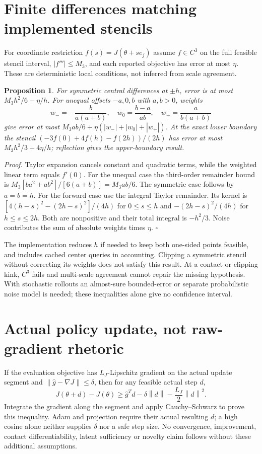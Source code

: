 \documentclass{article}
\newtheorem{proposition}{Proposition}
\newcommand{\norm}[1]{\left\|#1\right\|}
\begin{document}
\section{Finite differences matching implemented stencils}
For coordinate restriction $f(s)=J(\theta+se_j)$ assume $f\in C^3$ on the full feasible stencil interval, $|f'''|\le M_3$, and each reported objective has error at most $\eta$. These are deterministic local conditions, not inferred from scale agreement.
\begin{proposition}
For symmetric central differences at $\pm h$, error is at most $M_3h^2/6+\eta/h$. For unequal offsets $-a,0,b$ with $a,b>0$, weights
\[
w_-=-\frac{b}{a(a+b)},\quad w_0=\frac{b-a}{ab},\quad w_+=\frac{a}{b(a+b)}
\]
give error at most $M_3ab/6+\eta(|w_-|+|w_0|+|w_+|)$. At the exact lower boundary the stencil $(-3f(0)+4f(h)-f(2h))/(2h)$ has error at most $M_3h^2/3+4\eta/h$; reflection gives the upper-boundary result.
\end{proposition}
\noindent\textit{Proof.} Taylor expansion cancels constant and quadratic terms, while the weighted linear term equals $f'(0)$. For the unequal case the third-order remainder bound is
$M_3[ba^2+ab^2]/[6(a+b)]=M_3ab/6$. The symmetric case follows by $a=b=h$. For the forward case use the integral Taylor remainder. Its kernel is $[4(h-s)^2-(2h-s)^2]/(4h)$ for $0\le s\le h$ and $-(2h-s)^2/(4h)$ for $h\le s\le2h$. Both are nonpositive and their total integral is $-h^2/3$. Noise contributes the sum of absolute weights times $\eta$. $\square$

The implementation reduces $h$ if needed to keep both one-sided points feasible, and includes cached center queries in accounting. Clipping a symmetric stencil without correcting its weights does not satisfy this result. At a contact or clipping kink, $C^3$ fails and multi-scale agreement cannot repair the missing hypothesis. With stochastic rollouts an almost-sure bounded-error or separate probabilistic noise model is needed; these inequalities alone give no confidence interval.

\section{Actual policy update, not raw-gradient rhetoric}
If the evaluation objective has $L_J$-Lipschitz gradient on the actual update segment and $\norm{\widehat g-\nabla J}\le\delta$, then for any feasible actual step $d$,
\[
J(\theta+d)-J(\theta)\ge\widehat g^Td-\delta\norm d-\frac{L_J}{2}\norm d^2.
\]
Integrate the gradient along the segment and apply Cauchy--Schwarz to prove this inequality. Adam and projection require their actual resulting $d$; a high cosine alone neither supplies $\delta$ nor a safe step size. No convergence, improvement, contact differentiability, latent sufficiency or novelty claim follows without these additional assumptions.
\end{document}
